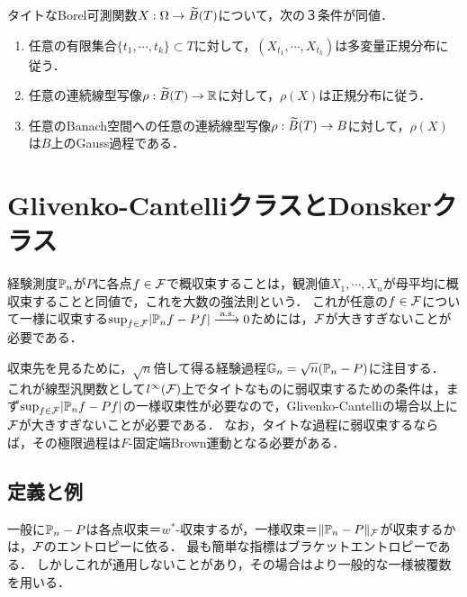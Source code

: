 \documentclass[uplatex,dvipdfmx]{jsreport}
\begin{document}
\begin{proposition}
    タイトなBorel可測関数$X:\Omega\to\widetilde{B}(T)$について，次の３条件が同値．
    \begin{enumerate}
        \item 任意の有限集合$\{t_1,\cdots,t_k\}\subset T$に対して，$(X_{t_1},\cdots,X_{t_k})$は多変量正規分布に従う．
        \item 任意の連続線型写像$\rho:\widetilde{B}(T)\to\mathbb{R}$に対して，$\rho(X)$は正規分布に従う．
        \item 任意のBanach空間への任意の連続線型写像$\rho:\widetilde{B}(T)\to B$に対して，$\rho(X)$は$B$上のGauss過程である．
    \end{enumerate}
\end{proposition}

\section{Glivenko-CantelliクラスとDonskerクラス}

\begin{tcolorbox}[colframe=ForestGreen, colback=ForestGreen!10!white,breakable,colbacktitle=ForestGreen!40!white,coltitle=black,fonttitle=\bfseries\sffamily,
title=]
    経験測度$\mathbb{P}_n$が$P$に各点$f\in\mathcal{F}$で概収束することは，観測値$X_1,\cdots,X_n$が母平均に概収束することと同値で，これを大数の強法則という．
    これが任意の$f\in\mathcal{F}$について一様に収束する$\sup_{f\in\mathcal{F}}\lvert\mathbb{P}_nf-Pf\rvert\xrightarrow{\;\mathrm{a.s.}}0$ためには，$\mathcal{F}$が大きすぎないことが必要である．

    収束先を見るために，$\sqrt{n}$倍して得る経験過程$\mathbb{G}_n=\sqrt{n}(\mathbb{P}_n-P)$に注目する．
    これが線型汎関数として$l^\infty(\mathcal{F})$上でタイトなものに弱収束するための条件は，まず$\sup_{f\in\mathcal{F}}\lvert\mathbb{P}_nf-Pf\rvert$の一様収束性が必要なので，Glivenko-Cantelliの場合以上に$\mathcal{F}$が大きすぎないことが必要である．
    なお，タイトな過程に弱収束するならば，その極限過程は$F$-固定端Brown運動となる必要がある．
\end{tcolorbox}

\subsection{定義と例}

\begin{tcolorbox}[colframe=ForestGreen, colback=ForestGreen!10!white,breakable,colbacktitle=ForestGreen!40!white,coltitle=black,fonttitle=\bfseries\sffamily,
title=]
    一般に$\mathbb{P}_n-P$は各点収束＝$w^*$-収束するが，一様収束＝$\|\mathbb{P}_n-P\|_{\mathcal{F}}$が収束するかは，$\mathcal{F}$のエントロピーに依る．
    最も簡単な指標はブラケットエントロピーである．
    しかしこれが通用しないことがあり，その場合はより一般的な一様被覆数を用いる．
\end{tcolorbox}
\end{document}
